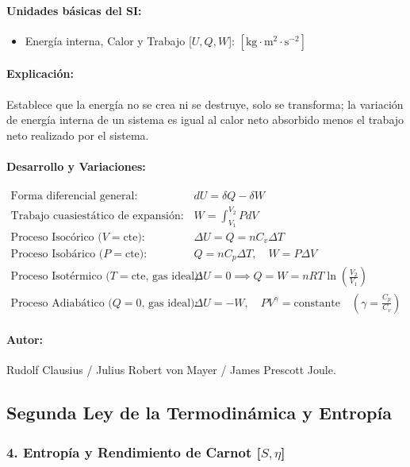 \documentclass[12pt,a4paper]{article}
\begin{document}
\paragraph*{Unidades básicas del SI:}
\begin{itemize}
    \item Energía interna, Calor y Trabajo [$U, Q, W$]: $[\text{kg}\cdot\text{m}^2\cdot\text{s}^{-2}]$
\end{itemize}
\paragraph*{Explicación:} Establece que la energía no se crea ni se destruye, solo se transforma; la variación de energía interna de un sistema es igual al calor neto absorbido menos el trabajo neto realizado por el sistema.
\paragraph*{Desarrollo y Variaciones:}
\begin{align*}
\text{Forma diferencial general:} \quad & dU = \delta Q - \delta W \\
\text{Trabajo cuasiestático de expansión:} \quad & W = \int_{V_1}^{V_2} P dV \\
\text{Proceso Isocórico ($V=\text{cte}$):} \quad & \Delta U = Q = n C_v \Delta T \\
\text{Proceso Isobárico ($P=\text{cte}$):} \quad & Q = n C_p \Delta T, \quad W = P \Delta V \\
\text{Proceso Isotérmico ($T=\text{cte}$, gas ideal):} \quad & \Delta U = 0 \implies Q = W = n R T \ln\left(\frac{V_2}{V_1}\right) \\
\text{Proceso Adiabático ($Q=0$, gas ideal):} \quad & \Delta U = -W, \quad P V^\gamma = \text{constante} \quad \left(\gamma = \frac{C_p}{C_v}\right)
\end{align*}
\paragraph*{Autor:} Rudolf Clausius / Julius Robert von Mayer / James Prescott Joule.

\subsection{Segunda Ley de la Termodinámica y Entropía}

\subsubsection*{4. Entropía y Rendimiento de Carnot [$S, \eta$]}
\end{document}
